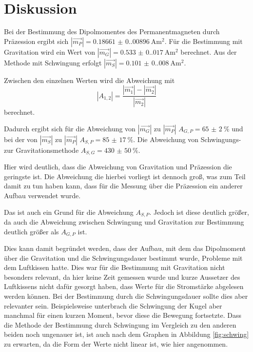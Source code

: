 \section{Diskussion}
Bei der Bestimmung des Dipolmomentes des Permanentmagneten durch Präzession ergibt sich $|\vec{m_P}|=\qty{0.18661(0.00896)}{\ampere\meter\squared}$. %
Für die Bestimmung mit Gravitation wird ein Wert von $|\vec{m_G}|=\qty{0.533(0.017)}{\ampere\meter\squared}$ berechnet.     %
Aus der Methode mit Schwingung erfolgt $|\vec{m_S}|=\qty{0.101(0.008)}{\ampere\meter\squared}$.                                %


Zwischen den einzelnen Werten wird die Abweichung mit 
\begin{equation}
    |A_{1,2}|=\frac{|\vec{m_1}|-|\vec{m_2}|}{|\vec{m_2}|}
\end{equation}
berechnet.

Dadurch ergibt sich für die Abweichung von $|\vec{m_G}|$ zu $|\vec{m_P}|$ $A_{G,P}=\qty{65(2)}{\percent}$ und bei der von $|\vec{m_S}|$ zu $|\vec{m_P}|$ $A_{S,P}=\qty{85(17)}{\percent}$.
Die Abweichung von Schwingungs- zur Gravitationsmethode $A_{S,G}=\qty{430(50)}{\percent}$.

Hier wird deutlich, dass die Abweichung von Gravitation und Präzession die geringste ist.
Die Abweichung die hierbei vorliegt ist dennoch groß, was zum Teil damit zu tun haben kann, dass für die Messung über die 
Präzession ein anderer Aufbau verwendet wurde.

Das ist auch ein Grund für die Abweichung $A_{S,P}$.
Jedoch ist diese deutlich größer, da auch die Abweichung zwischen Schwingung und Gravitation zur Bestimmung deutlich größer als $A_{G,P}$ ist.

Dies kann damit begründet werden, dass der Aufbau, mit dem das Dipolmoment über die Gravitation und 
die Schwingungsdauer bestimmt wurde, Probleme mit dem Luftkissen hatte.
Dies war für die Bestimmung mit Gravitation nicht besonders relevant, da hier keine Zeit gemessen wurde und kurze Aussetzer des Luftkissens nicht dafür gesorgt haben, dass Werte für die Stromstärke abgelesen werden können.
Bei der Bestimmung durch die Schwingungsdauer sollte dies aber relevanter sein.
Beispielsweise unterbrach die Schwingung der Kugel aber manchmal für 
einen kurzen Moment, bevor diese die Bewegung fortsetzte.
Dass die Methode der Bestimmung durch Schwingung im Vergleich zu den anderen beiden noch ungenauer ist, ist auch nach dem Graphen in Abbildung \ref{fig:schwing} zu erwarten, da die Form der Werte nicht linear ist, wie hier angenommen.
\label{sec:Diskussion}
